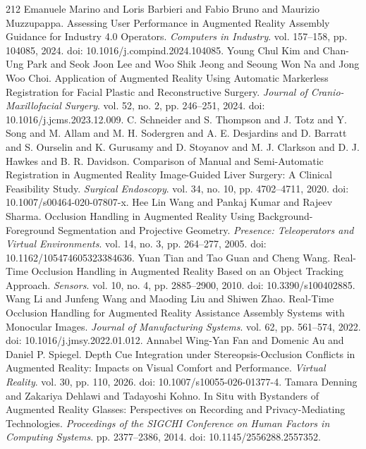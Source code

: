 \begin{thebibliography}{212}
 Emanuele Marino and Loris Barbieri and Fabio Bruno and Maurizio Muzzupappa. Assessing User Performance in Augmented Reality Assembly Guidance for Industry 4.0 Operators. \emph{Computers in Industry}. vol. 157--158, pp. 104085, 2024. doi: 10.1016/j.compind.2024.104085.
 Young Chul Kim and Chan-Ung Park and Seok Joon Lee and Woo Shik Jeong and Seoung Won Na and Jong Woo Choi. Application of Augmented Reality Using Automatic Markerless Registration for Facial Plastic and Reconstructive Surgery. \emph{Journal of Cranio-Maxillofacial Surgery}. vol. 52, no. 2, pp. 246--251, 2024. doi: 10.1016/j.jcms.2023.12.009.
 C. Schneider and S. Thompson and J. Totz and Y. Song and M. Allam and M. H. Sodergren and A. E. Desjardins and D. Barratt and S. Ourselin and K. Gurusamy and D. Stoyanov and M. J. Clarkson and D. J. Hawkes and B. R. Davidson. Comparison of Manual and Semi-Automatic Registration in Augmented Reality Image-Guided Liver Surgery: A Clinical Feasibility Study. \emph{Surgical Endoscopy}. vol. 34, no. 10, pp. 4702--4711, 2020. doi: 10.1007/s00464-020-07807-x.
 Hee Lin Wang and Pankaj Kumar and Rajeev Sharma. Occlusion Handling in Augmented Reality Using Background-Foreground Segmentation and Projective Geometry. \emph{Presence: Teleoperators and Virtual Environments}. vol. 14, no. 3, pp. 264--277, 2005. doi: 10.1162/105474605323384636.
 Yuan Tian and Tao Guan and Cheng Wang. Real-Time Occlusion Handling in Augmented Reality Based on an Object Tracking Approach. \emph{Sensors}. vol. 10, no. 4, pp. 2885--2900, 2010. doi: 10.3390/s100402885.
 Wang Li and Junfeng Wang and Maoding Liu and Shiwen Zhao. Real-Time Occlusion Handling for Augmented Reality Assistance Assembly Systems with Monocular Images. \emph{Journal of Manufacturing Systems}. vol. 62, pp. 561--574, 2022. doi: 10.1016/j.jmsy.2022.01.012.
 Annabel Wing-Yan Fan and Domenic Au and Daniel P. Spiegel. Depth Cue Integration under Stereopsis-Occlusion Conflicts in Augmented Reality: Impacts on Visual Comfort and Performance. \emph{Virtual Reality}. vol. 30, pp. 110, 2026. doi: 10.1007/s10055-026-01377-4.
 Tamara Denning and Zakariya Dehlawi and Tadayoshi Kohno. In Situ with Bystanders of Augmented Reality Glasses: Perspectives on Recording and Privacy-Mediating Technologies. \emph{Proceedings of the SIGCHI Conference on Human Factors in Computing Systems}. pp. 2377--2386, 2014. doi: 10.1145/2556288.2557352.

\end{thebibliography}
